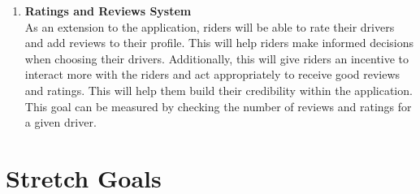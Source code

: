 \documentclass{article}
\begin{document}
\begin{enumerate}
\item \textbf{Ratings and Reviews System} \\
As an extension to the application, riders will be able to rate their drivers and add reviews to their profile. This will help riders make informed decisions when choosing their drivers. Additionally, this will give riders an incentive to interact more with the riders and act appropriately to receive good reviews and ratings. This will help them build their credibility within the application. This goal can be measured by checking the number of reviews and ratings for a given driver. 
\end{enumerate}

\section{Stretch Goals}
\end{document}
